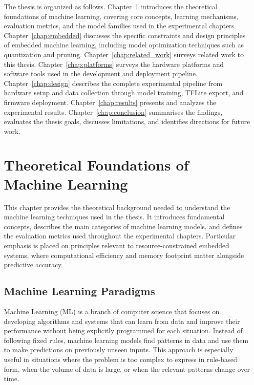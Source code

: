 The thesis is organized as follows.
Chapter~\ref{chap:theory} introduces the theoretical foundations of machine learning, covering core concepts, learning mechanisms, evaluation metrics, and the model families used in the experimental chapters.
Chapter~\ref{chap:embedded} discusses the specific constraints and design principles of embedded machine learning, including model optimization techniques such as quantization and pruning.
Chapter~\ref{chap:related_work} surveys related work to this thesis.
Chapter~\ref{chap:platforms} surveys the hardware platforms and software tools used in the development and deployment pipeline.
Chapter~\ref{chap:design} describes the complete experimental pipeline from hardware setup and data collection through model training, TFLite export, and firmware deployment.
Chapter~\ref{chap:results} presents and analyzes the experimental results.
Chapter~\ref{chap:conclusion} summarises the findings, evaluates the thesis goals, discusses limitations, and identifies directions for future work.

\chapter{Theoretical Foundations of Machine Learning}
\label{chap:theory}
This chapter provides the theoretical background needed to understand the machine learning techniques used in the thesis. It introduces fundamental concepts, describes the main categories of machine learning models, and defines the evaluation metrics used throughout the experimental chapters. Particular emphasis is placed on principles relevant to resource-constrained embedded systems, where computational efficiency and memory footprint matter alongside predictive accuracy.

\section{Machine Learning Paradigms}
\label{sec:intro_ml}

Machine Learning (ML) is a branch of computer science that focuses on developing algorithms and systems that can learn from data and improve their performance without being explicitly programmed for each situation. Instead of following fixed rules, machine learning models find patterns in data and use them to make predictions on previously unseen inputs. This approach is especially useful in situations where the problem is too complex to express in rule-based form, when the volume of data is large, or when the relevant patterns change over time.

